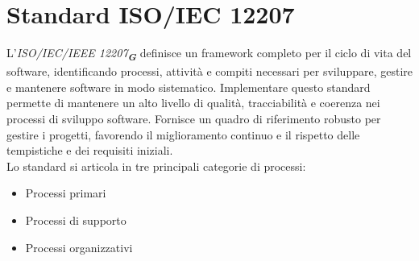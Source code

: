 

\appendix %


\section{Standard ISO/IEC 12207}

L'\emph{ISO/IEC/IEEE 12207}\textsubscript{\textit{\textbf{G}}} definisce un framework completo per il ciclo di vita del software, identificando processi, attività e compiti necessari per sviluppare, gestire e mantenere software in modo sistematico. Implementare questo standard permette di mantenere un alto livello di qualità, tracciabilità e coerenza nei processi di sviluppo software. Fornisce un quadro di riferimento robusto per gestire i progetti, favorendo il miglioramento continuo e il rispetto delle tempistiche e dei requisiti iniziali.\\
Lo standard si articola in tre principali categorie di processi:
\begin{itemize}
    \item Processi primari
    \item Processi di supporto
    \item Processi organizzativi
\end{itemize}

